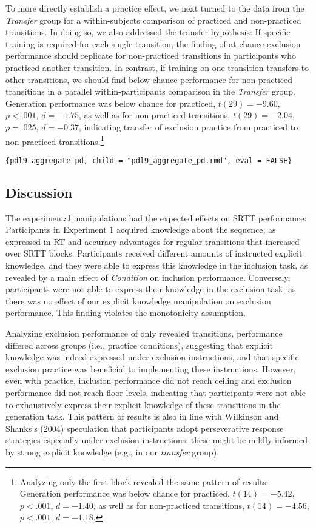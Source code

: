 \documentclass[english,,man]{apa6}
\begin{document}
To more directly establish a practice effect, we next turned to the data from the \emph{Transfer} group for a within-subjects comparison of practiced and non-practiced transitions.
In doing so, we also addressed the transfer hypothesis:
If specific training is required for each single transition, the finding of at-chance exclusion performance should replicate for non-practiced transitions in participants who practiced another transition.
In contrast, if training on one transition transfers to other transitions, we should find below-chance performance for non-practiced transitions in a parallel within-participants comparison in the \emph{Transfer} group.
Generation performance was below chance for practiced, \(t(29) = -9.60\), \(p < .001\), \(d = -1.75\), as well as for non-practiced transitions, \(t(29) = -2.04\), \(p = .025\), \(d = -0.37\), indicating transfer of exclusion practice from practiced to non-practiced transitions.\footnote{Analyzing only the first block revealed the same pattern of results: Generation performance was below chance for practiced, \(t(14) = -5.42\), \(p < .001\), \(d = -1.40\), as well as for non-practiced transitions, \(t(14) = -4.56\), \(p < .001\), \(d = -1.18\).}

\texttt{\{pdl9-aggregate-pd,\ child\ =\ "pdl9\_aggregate\_pd.rmd",\ eval\ =\ FALSE\}}

\hypertarget{discussion}{%
\subsection{Discussion}\label{discussion}}

The experimental manipulations had the expected effects on SRTT performance:
Participants in Experiment 1 acquired knowledge about the sequence, as expressed in RT and accuracy advantages for regular transitions that increased over SRTT blocks.
Participants received different amounts of instructed explicit knowledge, and they were able to express this knowledge in the inclusion task, as revealed by a main effect of \emph{Condition} on inclusion performance.
Conversely, participants were not able to express their knowledge in the exclusion task, as there was no effect of our explicit knowledge manipulation on exclusion performance.
This finding violates the monotonicity assumption.

Analyzing exclusion performance of only revealed transitions,
performance differed across groups (i.e., practice conditions),
suggesting that explicit knowledge was indeed expressed under exclusion instructions,
and that specific exclusion practice was beneficial to implementing these instructions.
However, even with practice, inclusion performance did not reach ceiling and exclusion performance did not reach floor levels,
indicating that participants were not able to exhaustively express their explicit knowledge of these transitions in the generation task.
This pattern of results is also in line with Wilkinson and Shanks's (2004) speculation that participants adopt perseverative response strategies especially under exclusion instructions; these might be mildly informed by strong explicit knowledge (e.g., in our \emph{transfer} group).
\end{document}
